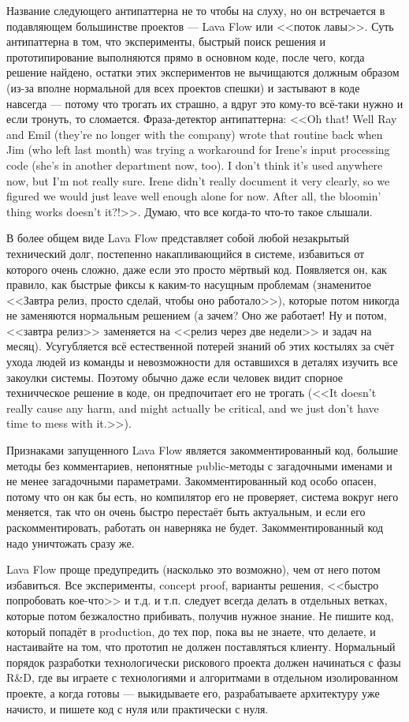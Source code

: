 \documentclass{../../text-style}
\begin{document}
Название следующего антипаттерна не то чтобы на слуху, но он встречается в подавляющем большинстве проектов --- Lava Flow или <<поток лавы>>. Суть антипаттерна в том, что эксперименты, быстрый поиск решения и прототипирование выполняются прямо в основном коде, после чего, когда решение найдено, остатки этих экспериментов не вычищаются должным образом (из-за вполне нормальной для всех проектов спешки) и застывают в коде навсегда --- потому что трогать их страшно, а вдруг это кому-то всё-таки нужно и если тронуть, то сломается. Фраза-детектор антипаттерна: <<Oh that! Well Ray and Emil (they’re no longer with the company) wrote that routine back when Jim (who left last month) was trying a workaround for Irene’s input processing code (she’s in another department now, too). I don’t think it’s used anywhere now, but I’m not really sure. Irene didn’t really document it very clearly, so we figured we would just leave well enough alone for now. After all, the bloomin’ thing works doesn’t it?!>>. Думаю, что все когда-то что-то такое слышали.

В более общем виде Lava Flow представляет собой любой незакрытый технический долг, постепенно накапливающийся в системе, избавиться от которого очень сложно, даже если это просто мёртвый код. Появляется он, как правило, как быстрые фиксы к каким-то насущным проблемам (знаменитое <<Завтра релиз, просто сделай, чтобы оно работало>>), которые потом никогда не заменяются нормальным решением (а зачем? Оно же работает! Ну и потом, <<завтра релиз>> заменяется на <<релиз через две недели>> и задач на месяц). Усугубляется всё естественной потерей знаний об этих костылях за счёт ухода людей из команды и невозможности для оставшихся в деталях изучить все закоулки системы. Поэтому обычно даже если человек видит спорное техничческое решение в коде, он предпочитает его не трогать (<<It doesn’t really cause any harm, and might actually be critical, and we just don’t have time to mess with it.>>).

Признаками запущенного Lava Flow является закомментированный код, большие методы без комментариев, непонятные public-методы с загадочными именами и не менее загадочными параметрами. Закомментированный код особо опасен, потому что он как бы есть, но компилятор его не проверяет, система вокруг него меняется, так что он очень быстро перестаёт быть актуальным, и если его раскомментировать, работать он наверняка не будет. Закомментированный код надо уничтожать сразу же.

Lava Flow проще предупредить (насколько это возможно), чем от него потом избавиться. Все эксперименты, concept proof, варианты решения, <<быстро попробовать кое-что>> и т.д. и т.п. следует всегда делать в отдельных ветках, которые потом безжалостно прибивать, получив нужное знание. Не пишите код, который попадёт в production, до тех пор, пока вы не знаете, что делаете, и настаивайте на том, что прототип не должен поставляться клиенту. Нормальный порядок разработки технологически рискового проекта должен начинаться с фазы R\&D, где вы играете с технологиями и алгоритмами в отдельном изолированном проекте, а когда готовы --- выкидываете его, разрабатываете архитектуру уже начисто, и пишете код с нуля или практически с нуля.
\end{document}
